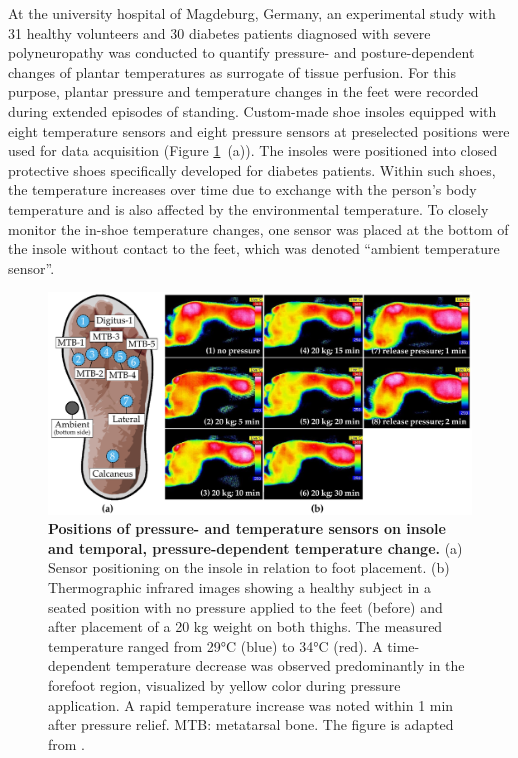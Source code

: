 \documentclass[
  oneside]{book}
\begin{document}
At the university hospital of Magdeburg, Germany, an experimental study with 31 healthy volunteers and 30 diabetes patients diagnosed with severe polyneuropathy was conducted to quantify pressure- and posture-dependent changes of plantar temperatures as surrogate of tissue perfusion.
For this purpose, plantar pressure and temperature changes in the feet were recorded during extended episodes of standing.
Custom-made shoe insoles \autocite{GruetznerEtAl:SmartDiabeticInsole2015} equipped with eight temperature sensors and eight pressure sensors at preselected positions were used for data acquisition (Figure \ref{fig:02-df-infrared-sole-sensor-positions-plot}~(a)).
The insoles were positioned into closed protective shoes specifically developed for diabetes patients.
Within such shoes, the temperature increases over time due to exchange with the person's body temperature and is also affected by the environmental temperature.
To closely monitor the in-shoe temperature changes, one sensor was placed at the bottom of the insole without contact to the feet, which was denoted ``ambient temperature sensor''.



\begin{figure}[htb]
\includegraphics[width=1\linewidth]{figures/02-df-infrared-sole-sensor-positions} \caption[fig.scap]{\textbf{Positions of pressure- and temperature sensors on insole and temporal, pressure-dependent temperature change.} (a) Sensor positioning on the insole in relation to foot placement. (b) Thermographic infrared images showing a healthy subject in a seated position with no pressure applied to the feet (before) and after placement of a 20 kg weight on both thighs. The measured temperature ranged from 29°C (blue) to 34°C (red). A time-dependent temperature decrease was observed predominantly in the forefoot region, visualized by yellow color during pressure application. A rapid temperature increase was noted within 1 min after pressure relief. MTB: metatarsal bone. The figure is adapted from \autocite{Niemann:EBioMedicine2020}.}\label{fig:02-df-infrared-sole-sensor-positions-plot}
\end{figure}
\end{document}
